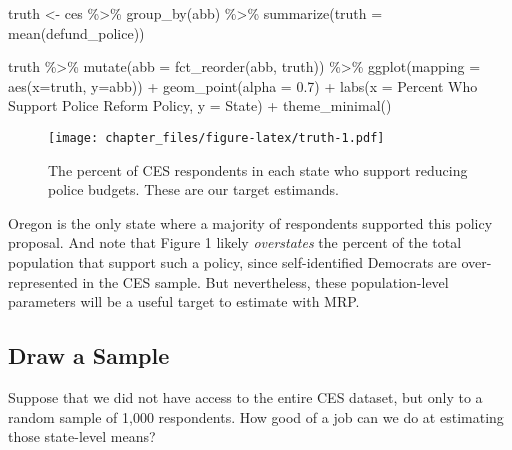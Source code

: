 \documentclass[
]{article}
\newenvironment{Shaded}{\begin{snugshade}}{\end{snugshade}}
\newcommand{\AttributeTok}[1]{\textcolor[rgb]{0.77,0.63,0.00}{#1}}
\newcommand{\FloatTok}[1]{\textcolor[rgb]{0.00,0.00,0.81}{#1}}
\newcommand{\FunctionTok}[1]{\textcolor[rgb]{0.00,0.00,0.00}{#1}}
\newcommand{\NormalTok}[1]{#1}
\newcommand{\OtherTok}[1]{\textcolor[rgb]{0.56,0.35,0.01}{#1}}
\newcommand{\SpecialCharTok}[1]{\textcolor[rgb]{0.00,0.00,0.00}{#1}}
\newcommand{\StringTok}[1]{\textcolor[rgb]{0.31,0.60,0.02}{#1}}
\begin{document}
\begin{Shaded}
\begin{Highlighting}[]
\NormalTok{truth }\OtherTok{\textless{}{-}}\NormalTok{ ces }\SpecialCharTok{\%\textgreater{}\%} 
  \FunctionTok{group\_by}\NormalTok{(abb) }\SpecialCharTok{\%\textgreater{}\%} 
  \FunctionTok{summarize}\NormalTok{(}\AttributeTok{truth =} \FunctionTok{mean}\NormalTok{(defund\_police))}

\NormalTok{truth }\SpecialCharTok{\%\textgreater{}\%} 
  \FunctionTok{mutate}\NormalTok{(}\AttributeTok{abb =} \FunctionTok{fct\_reorder}\NormalTok{(abb, truth)) }\SpecialCharTok{\%\textgreater{}\%} 
  \FunctionTok{ggplot}\NormalTok{(}\AttributeTok{mapping =} \FunctionTok{aes}\NormalTok{(}\AttributeTok{x=}\NormalTok{truth, }\AttributeTok{y=}\NormalTok{abb)) }\SpecialCharTok{+}
  \FunctionTok{geom\_point}\NormalTok{(}\AttributeTok{alpha =} \FloatTok{0.7}\NormalTok{) }\SpecialCharTok{+}
  \FunctionTok{labs}\NormalTok{(}\AttributeTok{x =} \StringTok{\textquotesingle{}Percent Who Support Police Reform Policy\textquotesingle{}}\NormalTok{,}
       \AttributeTok{y =} \StringTok{\textquotesingle{}State\textquotesingle{}}\NormalTok{) }\SpecialCharTok{+}
  \FunctionTok{theme\_minimal}\NormalTok{()}
\end{Highlighting}
\end{Shaded}

\begin{figure}
\centering
\texttt{[image: chapter\_files/figure-latex/truth-1.pdf]}
\caption{The percent of CES respondents in each state who support
reducing police budgets. These are our target estimands.}
\end{figure}

Oregon is the only state where a majority of respondents supported this
policy proposal. And note that Figure 1 likely \emph{overstates} the
percent of the total population that support such a policy, since
self-identified Democrats are over-represented in the CES sample. But
nevertheless, these population-level parameters will be a useful target
to estimate with MRP.

\hypertarget{draw-a-sample}{%
\subsection{Draw a Sample}\label{draw-a-sample}}

Suppose that we did not have access to the entire CES dataset, but only
to a random sample of 1,000 respondents. How good of a job can we do at
estimating those state-level means?
\end{document}
